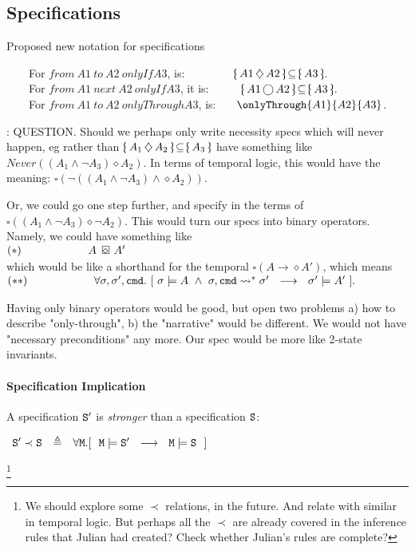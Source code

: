 \label{sect:notation}



\subsection{Specifications} Proposed new notation for specifications 

\noindent 
\ \ \ \ For $from\ A1\ to\  A2\ onlyIf A3$, is: \ \ \ \ \ \ \  \  $\onlyIf{A1} {A2} {A3}$. \\
\ \ \ \ For $from\ A1\ next\  A2\ onlyIf A3$, it is: \ \ \ \ \  $\onlyIfSingle{A1} {A2} {A3}$.
\\
\ \ \ \  For  $from\ A1\ to\  A2\ onlyThrough A3$, is:  \ \ \ $\onlyThrough{A1} {A2} {A3}$.

\vspace{.1in}
\noindent
\SP: QUESTION. Should we  perhaps only write necessity specs which will never happen, eg rather than 
$\onlyIf{A_1}{A_2}{A_3}$ have something like 
$Never({(A_1 \wedge \neg A_3) \diamond A_2})$. In terms of temporal logic, this would have the meaning: {$\square( \neg ( {(A_1 \wedge \neg A_3)  \wedge  \diamond A_2}))$}.  

Or, we could go one step further, and specify in the terms of $\square( ( A_1 \wedge \neg A_3) \diamond \neg A_2)$. This would turn our specs into binary operators. 
Namely, we could have something like \\
$(*)\ \  \strut \ \ \ \ \ \ \ \ \ \ \ \ \ \ \ \   A\   \diamond\!\!\!\!\!\square \ A'$  \\
which would be like a shorthand for  the temporal  $\square ( A \rightarrow \diamond A')$, which means 
\\
$(**)\ \  \strut \ \ \ \ \ \ \ \ \ \ \ \ \ \ \ \ \forall \sigma, \sigma',\prg{cmd}.\ [ \ \sigma \models A  \ \wedge\ \sigma, \prg{cmd} \leadsto^* \sigma' \    \   \longrightarrow \ \ \sigma' \models A'\ ].$

 Having only binary operators would be good, but open two problems a) how to describe "only-through", b) the "narrative" would be different. We would not have "necessary preconditions" any more. Our spec would be more like 2-state invariants.

\paragraph{Specification Implication}
\label{lab:def:imply}

\begin{definition}
A specification ${\texttt{S}}{'}$ is \emph{stronger} than a specification ${\texttt{S}}{}$:

$\begin{array}{lll}
 \SpecB{'}\prec \SpecB{} & \triangleq &  
 \forall  \Mod . [\ \  \Mod \models \SpecB{'} \ \ \longrightarrow\ \   \Mod  \models \SpecB{}\ \ ]
  \end{array}
$

\end{definition}\footnote{ We should explore some $\prec$ relations, in the future. And relate with similar in temporal logic. But perhaps all the $\prec$ are already covered in the inference rules that Julian had created? Check whether Julian's rules are complete?}


